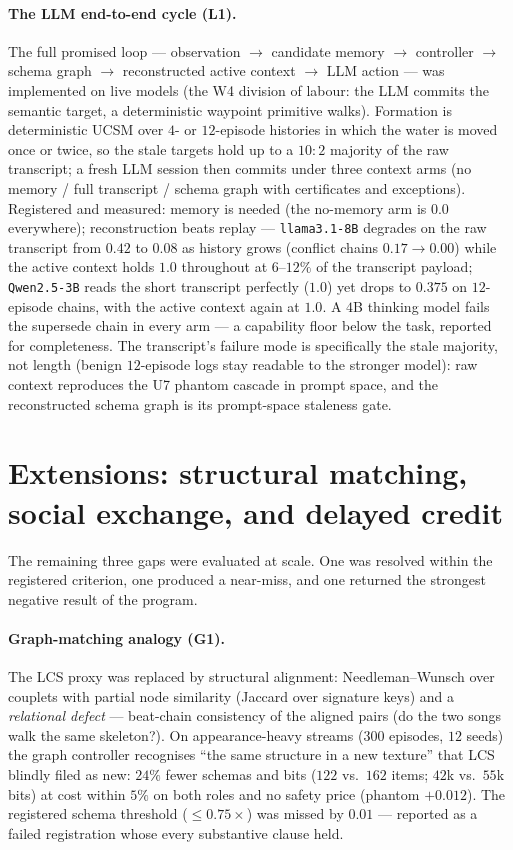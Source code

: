 \documentclass{article}
\begin{document}
\paragraph{The LLM end-to-end cycle (L1).} The full promised loop ---
observation $\to$ candidate memory $\to$ controller $\to$ schema
graph $\to$ reconstructed active context $\to$ LLM action --- was
implemented on live models (the W4 division of labour: the LLM commits the
semantic target, a deterministic waypoint primitive walks). Formation
is deterministic UCSM over $4$- or $12$-episode histories in which
the water is moved once or twice, so the stale targets hold up to a
$10{:}2$ majority of the raw transcript; a fresh LLM session then
commits under three context arms (no memory / full transcript /
schema graph with certificates and exceptions). Registered and
measured: memory is needed (the no-memory arm is $0.0$ everywhere);
reconstruction beats replay --- \texttt{llama3.1-8B} degrades on the
raw transcript from $0.42$ to $0.08$ as history grows (conflict
chains $0.17 \to 0.00$) while the active context holds $1.0$
throughout at $6$--$12\%$ of the transcript payload;
\texttt{Qwen2.5-3B} reads the short transcript perfectly ($1.0$) yet
drops to $0.375$ on $12$-episode chains, with the active context
again at $1.0$. A $4$B thinking model fails the supersede chain in
every arm --- a capability floor below the task, reported for
completeness. The transcript's failure mode is specifically the stale
majority, not length (benign $12$-episode logs stay readable to the
stronger model): raw context reproduces the U7 phantom cascade in
prompt space, and the reconstructed schema graph is its prompt-space
staleness gate.


\section{Extensions: structural matching, social exchange, and delayed credit}
\label{p5:sec:echelon3}

The remaining three gaps were evaluated at scale. One was resolved within the registered criterion, one produced a near-miss, and one returned the strongest negative result of
the program.

\paragraph{Graph-matching analogy (G1).} The LCS proxy was replaced
by structural alignment: Needleman--Wunsch over couplets with partial
node similarity (Jaccard over signature keys) and a \emph{relational
defect} --- beat-chain consistency of the aligned pairs (do the two
songs walk the same skeleton?). On appearance-heavy streams
($300$ episodes, $12$ seeds) the graph controller recognises ``the
same structure in a new texture'' that LCS blindly filed as new:
$24\%$ fewer schemas and bits ($122$ vs.\ $162$ items; $42$k vs.\
$55$k bits) at cost within $5\%$ on both roles and no safety price
(phantom $+0.012$). The registered schema threshold ($\le 0.75\times$)
was missed by $0.01$ --- reported as a failed registration whose
every substantive clause held.
\end{document}
